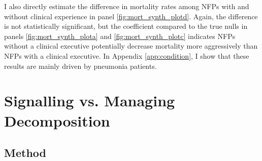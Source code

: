 \documentclass[12pt]{article}
\begin{document}

    I also directly estimate the difference in mortality rates among NFPs with and without clinical experience in panel \ref{fig:mort_synth_plotd}. Again, the difference is not statistically significant, but the coefficient compared to the true nulls in panels \ref{fig:mort_synth_plota} and \ref{fig:mort_synth_plotc} indicates NFPs without a clinical executive potentially decrease mortality more aggressively than NFPs with a clinical executive. In Appendix \ref{app:condition}, I show that these results are mainly driven by pneumonia patients.  

\section{Signalling vs. Managing Decomposition}

\subsection{Method}
\end{document}
